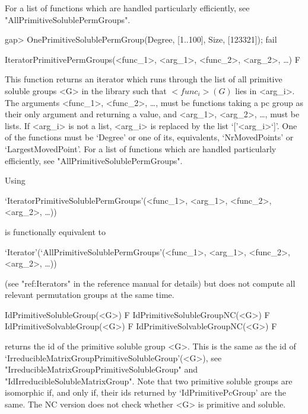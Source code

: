 For a list of functions which are handled particularly efficiently, see
"AllPrimitiveSolublePermGroups".

\beginexample
gap> OnePrimitiveSolublePermGroup(Degree, [1..100], Size, [123321]);
fail
\endexample

\>IteratorPrimitivePermGroups(<func_1>, <arg_1>, <func_2>, <arg_2>, \dots) F

This function returns an iterator which runs through the list of all primitive soluble
groups <G> in the  {\IRREDSOL} library such that
$<func_i>(G)$ lies in <arg_i>. The arguments <func_1>, <func_2>, \dots,
must be {\GAP} functions taking a pc group as their only argument and returning 
a value, and <arg_1>, <arg_2>, \dots, 
must be lists. If <arg_i> is not a list, <arg_i> is replaced by the list `['<arg_i>`]'.
One of the functions must be `Degree' or one of its, equivalents, `NrMovedPoints' 
or `LargestMovedPoint'.
For a list of functions which are handled particularly efficiently, see
"AllPrimitiveSolublePermGroups".

Using 

`IteratorPrimitiveSolublePermGroups'(<func_1>, <arg_1>, <func_2>, <arg_2>, \dots)) 

is functionally equivalent to 

`Iterator'(`AllPrimitiveSolublePermGroups'(<func_1>, <arg_1>, <func_2>, <arg_2>, \dots))

(see "ref:Iterators" in the {\GAP} reference manual for details) but does not 
compute all relevant permutation groups at the same time. 


\null


\>IdPrimitiveSolubleGroup(<G>) F
\>IdPrimitiveSolubleGroupNC(<G>) F
\>IdPrimitiveSolvableGroup(<G>) F
\>IdPrimitiveSolvableGroupNC(<G>) F

returns the id of the primitive soluble group <G>. This is the same as
the id of `IrreducibleMatrixGroupPrimitiveSolubleGroup'(<G>), see "IrreducibleMatrixGroupPrimitiveSolubleGroup" and "IdIrreducibleSolubleMatrixGroup".
Note that two primitive soluble groups are isomorphic if, and only if, their
ids returned by `IdPrimitivePcGroup' are the same. The NC version does not
check whether <G> is primitive and soluble.

